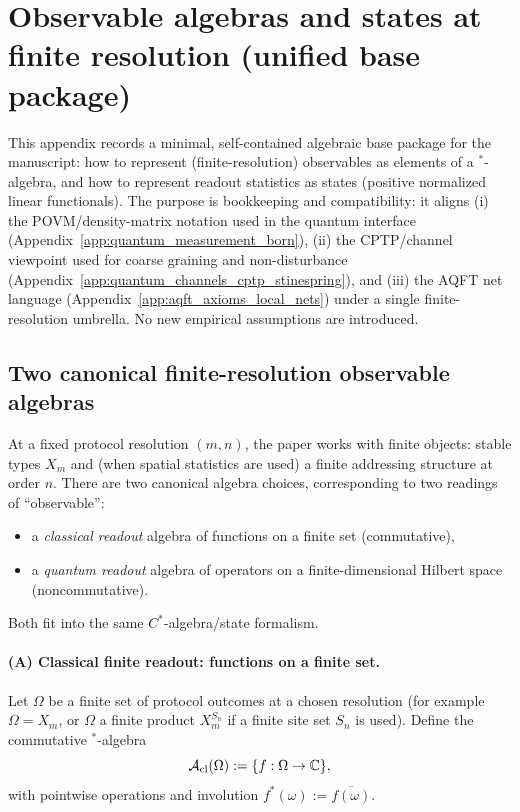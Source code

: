 \section{Observable algebras and states at finite resolution (unified base package)}
\label{app:observable_algebra_state_base}

This appendix records a minimal, self-contained algebraic base package for the manuscript:
how to represent (finite-resolution) observables as elements of a $^\ast$-algebra, and how to represent readout statistics as states (positive normalized linear functionals).
The purpose is bookkeeping and compatibility:
it aligns (i) the POVM/density-matrix notation used in the quantum interface (Appendix~\ref{app:quantum_measurement_born}),
(ii) the CPTP/channel viewpoint used for coarse graining and non-disturbance (Appendix~\ref{app:quantum_channels_cptp_stinespring}),
and (iii) the AQFT net language (Appendix~\ref{app:aqft_axioms_local_nets}) under a single finite-resolution umbrella.
No new empirical assumptions are introduced.

\subsection{Two canonical finite-resolution observable algebras}

At a fixed protocol resolution $(m,n)$, the paper works with finite objects:
stable types $X_m$ and (when spatial statistics are used) a finite addressing structure at order $n$.
There are two canonical algebra choices, corresponding to two readings of ``observable'':
\begin{itemize}
\item a \emph{classical readout} algebra of functions on a finite set (commutative),
\item a \emph{quantum readout} algebra of operators on a finite-dimensional Hilbert space (noncommutative).
\end{itemize}
Both fit into the same $C^\ast$-algebra/state formalism.

\paragraph{(A) Classical finite readout: functions on a finite set.}
Let $\Omega$ be a finite set of protocol outcomes at a chosen resolution (for example $\Omega=X_m$, or $\Omega$ a finite product $X_m^{S_n}$ if a finite site set $S_n$ is used).
Define the commutative $^\ast$-algebra
\[
\mathcal{A}_{\mathrm{cl}}(\Omega):=\{f:\Omega\to\mathbb{C}\},
\]
with pointwise operations and involution $f^\ast(\omega):=\overline{f(\omega)}$.

